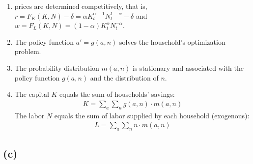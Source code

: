 \documentclass{ltjsarticle}
\begin{document}
\begin{enumerate}
  \item prices are determined competitively, that is, $r = F_K (K,N) - \delta = \alpha K_t^{\alpha-1} N_t^{1-\alpha} - \delta$ and $w = F_L (K, N) = (1-\alpha) K_t^\alpha N_t^{-\alpha}$.
  \item The policy function $a' = g(a,n)$ solves the household's optimization problem.
  \item The probability distribution $m(a,n)$ is stationary and associated with the policy function $g(a,n)$ and the distribution of $n$.
  \item The capital $K$ equals the sum of households' savings:
    \begin{gather*}
      K = \sum_a \sum_n g(a,n) \cdot m(a,n)
    \end{gather*}
    The labor $N$ equals the sum of labor supplied by each household (exogenous):
    \begin{gather*}
      L = \sum_a \sum_n n \cdot m(a,n)
    \end{gather*}   
\end{enumerate}

\subsection*{(c)}
\end{document}
